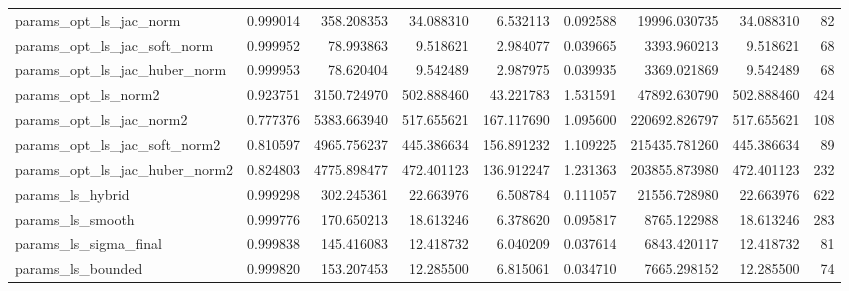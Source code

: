 \documentclass[10pt,a4paper]{article}
\begin{document}
\begin{table}[ht]
{\begin{tabular}{lrrrrrrrr}
params\_opt\_ls\_jac\_norm & 0.999014 & 358.208353 & 34.088310 & 6.532113 & 0.092588 & 19996.030735 & 34.088310 & 82 \\
params\_opt\_ls\_jac\_soft\_norm & 0.999952 & 78.993863 & 9.518621 & 2.984077 & 0.039665 & 3393.960213 & 9.518621 & 68 \\
params\_opt\_ls\_jac\_huber\_norm & 0.999953 & 78.620404 & 9.542489 & 2.987975 & 0.039935 & 3369.021869 & 9.542489 & 68 \\
params\_opt\_ls\_norm2 & 0.923751 & 3150.724970 & 502.888460 & 43.221783 & 1.531591 & 47892.630790 & 502.888460 & 424 \\
params\_opt\_ls\_jac\_norm2 & 0.777376 & 5383.663940 & 517.655621 & 167.117690 & 1.095600 & 220692.826797 & 517.655621 & 108 \\
params\_opt\_ls\_jac\_soft\_norm2 & 0.810597 & 4965.756237 & 445.386634 & 156.891232 & 1.109225 & 215435.781260 & 445.386634 & 89 \\
params\_opt\_ls\_jac\_huber\_norm2 & 0.824803 & 4775.898477 & 472.401123 & 136.912247 & 1.231363 & 203855.873980 & 472.401123 & 232 \\
params\_ls\_hybrid & 0.999298 & 302.245361 & 22.663976 & 6.508784 & 0.111057 & 21556.728980 & 22.663976 & 622 \\
params\_ls\_smooth & 0.999776 & 170.650213 & 18.613246 & 6.378620 & 0.095817 & 8765.122988 & 18.613246 & 283 \\
params\_ls\_sigma\_final & 0.999838 & 145.416083 & 12.418732 & 6.040209 & 0.037614 & 6843.420117 & 12.418732 & 81 \\
params\_ls\_bounded & 0.999820 & 153.207453 & 12.285500 & 6.815061 & 0.034710 & 7665.298152 & 12.285500 & 74 \\
\bottomrule
\end{tabular}%
}
\end{table}




\end{document}
